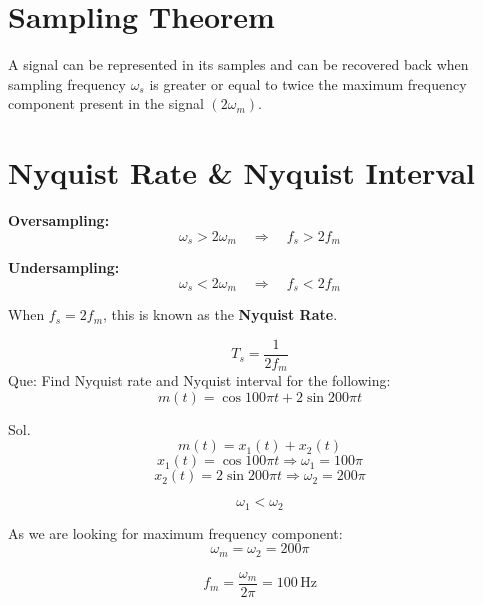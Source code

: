 \documentclass[12pt,a4paper]{report}
\begin{document}
\section*{Sampling Theorem}
A signal can be represented in its samples and can be recovered back when sampling frequency \( \omega_s \) is greater or equal to twice the maximum frequency component present in the signal \( (2 \omega_m) \).

\section*{Nyquist Rate \& Nyquist Interval}

\textbf{Oversampling:}
\[
\omega_s > 2 \omega_m \quad \Rightarrow \quad f_s > 2 f_m
\]

\textbf{Undersampling:}
\[
\omega_s < 2 \omega_m \quad \Rightarrow \quad f_s < 2 f_m
\]

\begin{center}
\end{center}

When \( f_s = 2 f_m \), this is known as the \textbf{Nyquist Rate}.

\[
T_s = \frac{1}{2 f_m}
\]
Que: Find Nyquist rate and Nyquist interval for the following:
\[
m(t) = \cos 100 \pi t + 2 \sin 200 \pi t
\]

Sol.
\[
m(t) = x_1(t) + x_2(t)
\]
\[
x_1(t) = \cos 100 \pi t \Rightarrow \omega_1 = 100 \pi
\]
\[
x_2(t) = 2 \sin 200 \pi t \Rightarrow \omega_2 = 200 \pi
\]

\[
\omega_1 < \omega_2
\]

As we are looking for maximum frequency component:
\[
\omega_m = \omega_2 = 200 \pi
\]

\[
f_m = \frac{\omega_m}{2 \pi} = 100 \, \text{Hz}
\]
\end{document}
